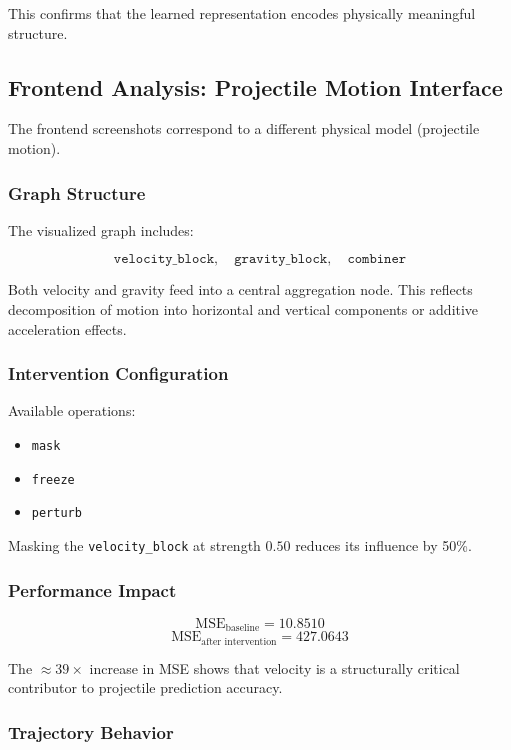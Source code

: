 \documentclass[12pt,singleside,a4paper]{article}
\begin{document}
This confirms that the learned representation encodes physically meaningful structure.

\subsection{Frontend Analysis: Projectile Motion Interface}

The frontend screenshots correspond to a different physical model (projectile motion).

\subsubsection{Graph Structure}

The visualized graph includes:

\[
\texttt{velocity\_block}, \quad
\texttt{gravity\_block}, \quad
\texttt{combiner}
\]

Both velocity and gravity feed into a central aggregation node. This reflects decomposition of motion into horizontal and vertical components or additive acceleration effects.

\subsubsection{Intervention Configuration}

Available operations:
\begin{itemize}
    \item \texttt{mask}
    \item \texttt{freeze}
    \item \texttt{perturb}
\end{itemize}

Masking the \texttt{velocity\_block} at strength $0.50$ reduces its influence by 50\%.

\subsubsection{Performance Impact}

\[
\text{MSE}_{\text{baseline}} = 10.8510
\]
\[
\text{MSE}_{\text{after intervention}} = 427.0643
\]

The $\approx 39\times$ increase in MSE shows that velocity is a structurally critical contributor to projectile prediction accuracy.

\subsubsection{Trajectory Behavior}
\end{document}
